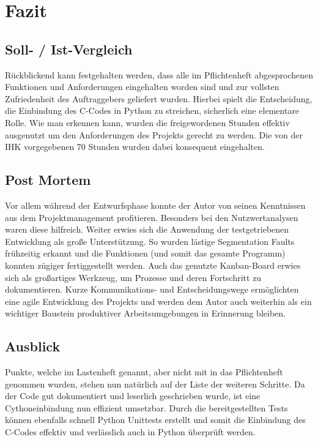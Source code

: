 \section{Fazit}
\label{section:postmortem}
\subsection{Soll- / Ist-Vergleich}
Rückblickend kann festgehalten werden, dass alle im Pflichtenheft
abgesprochenen Funktionen und Anforderungen eingehalten worden sind
und zur vollsten Zufriedenheit des Auftraggebers geliefert wurden. Hierbei
spielt die Entscheidung, die Einbindung des C-Codes in Python zu streichen, sicherlich
eine elementare Rolle. Wie man erkennen kann, wurden die freigewordenen Stunden effektiv
ausgenutzt um den Anforderungen des Projekts gerecht zu werden. Die von der IHK vorgegebenen 70 Stunden wurden dabei konsequent eingehalten.

\subsection{Post Mortem}

Vor allem während der Entwurfsphase konnte der Autor von seinen Kenntnissen aus dem Projektmanagement profitieren.
Besonders bei den Nutzwertanalysen waren diese hilfreich. Weiter erwies sich die Anwendung der
testgetriebenen Entwicklung als große Unterstützung. So wurden lästige Segmentation Faults frühzeitig erkannt und die Funktionen (und somit das gesamte Programm) konnten zügiger fertiggestellt werden.
Auch das genutzte Kanban-Board erwies sich als großartiges Werkzeug, um Prozesse und deren Fortschritt zu dokumentieren.
Kurze Kommunikations- und Entscheidungswege ermöglichten eine agile Entwicklung des Projekts und werden
dem Autor auch weiterhin als ein wichtiger Baustein produktiver Arbeitsumgebungen in Erinnerung bleiben.

\subsection{Ausblick}
Punkte, welche im Lastenheft genannt, aber nicht mit in das Pflichtenheft genommen wurden,
stehen nun natürlich auf der Liste der weiteren Schritte. Da der Code gut dokumentiert
und leserlich geschrieben wurde, ist eine Cythoneinbindung nun effizient umsetzbar.
Durch die bereitgestellten Tests können ebenfalls schnell Python Unittests erstellt und somit
die Einbindung des C-Codes effektiv und verlässlich auch in Python überprüft werden.

